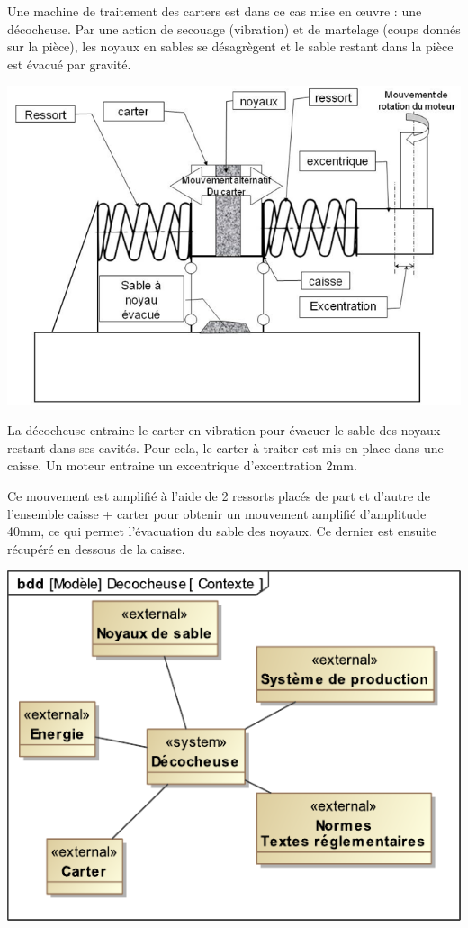 Une machine de traitement des carters est dans ce cas mise en \oe uvre : une décocheuse. Par une action de secouage (vibration) et de martelage (coups donnés sur la pièce), les noyaux en sables se désagrègent et le sable restant dans la pièce est évacué par gravité.

\begin{center}
	\includegraphics[width=0.7\linewidth]{img/05}
\end{center}

\begin{minipage}{0.55\linewidth}
La décocheuse entraine le carter en vibration pour évacuer le sable des noyaux restant dans ses cavités. Pour cela, le carter à traiter est mis en place dans une caisse. Un moteur entraine un excentrique d'excentration 2mm.

Ce mouvement est amplifié à l'aide de 2 ressorts placés de part et d'autre de l'ensemble caisse + carter pour obtenir	un mouvement amplifié d'amplitude 40mm, ce qui permet l'évacuation du sable des noyaux. Ce dernier est ensuite récupéré en dessous de la caisse.
\end{minipage}\hfill
\begin{minipage}{0.55\linewidth}
\begin{center}
	\includegraphics[width=0.7\linewidth]{img/Decocheuse_Contexte}
\end{center}
\end{minipage}

